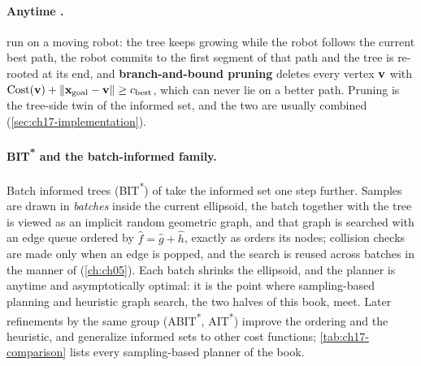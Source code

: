 \paragraph{Anytime \rrtstar.}
\textcite{karaman2011anytime} run \rrtstar on a moving robot: the tree keeps
growing while the robot follows the current best path, the robot commits to
the first segment of that path and the tree is re-rooted at its end, and
\textbf{branch-and-bound pruning} deletes
every vertex $\mathbf{v}$ with $\mathrm{Cost}(\mathbf{v})+\left\lVert \mathbf{x}_{\mathrm{goal}}-\mathbf{v} \right\rVert\ge c_{\mathrm{best}}$,
which can never lie on a better path. Pruning is the tree-side twin of the
informed set, and the two are usually combined
(\cref{sec:ch17-implementation}).

\paragraph{BIT\textsuperscript{*} and the batch-informed family.}
Batch informed trees (BIT\textsuperscript{*}) of
\textcite{gammell2015bit} take the informed set one step further. Samples
are drawn in \emph{batches} inside the current ellipsoid, the batch together
with the tree is viewed as an implicit random geometric graph, and that
graph is searched with an edge queue ordered by
$\hat f=\hat g+\hat h$, exactly as \astar orders its nodes; collision
checks are made only when an edge is popped, and the search is reused across
batches in the manner of \lpastar (\cref{ch:ch05}). Each batch shrinks the
ellipsoid, and the planner is anytime and asymptotically optimal: it is the
point where sampling-based planning and heuristic graph search, the two
halves of this book, meet. Later refinements by the same group
(ABIT\textsuperscript{*}, AIT\textsuperscript{*}) improve the ordering and
the heuristic, and \textcite{gammell2018informed} generalize informed sets
to other cost functions; \cref{tab:ch17-comparison} lists every
sampling-based planner of the book.


